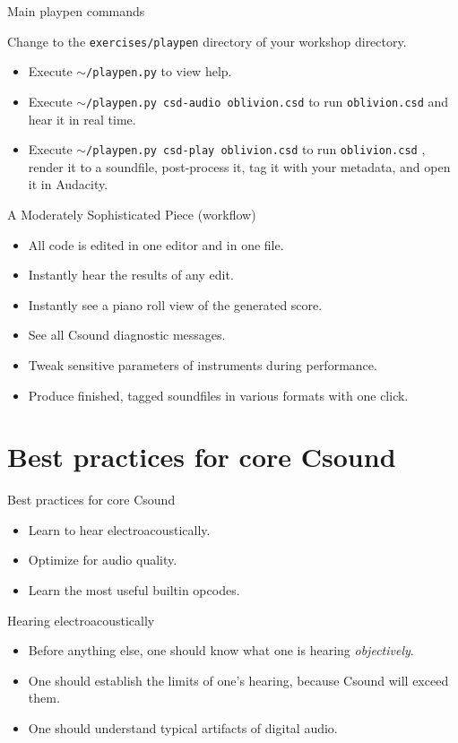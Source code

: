 \documentclass{beamer}
\begin{document}
\begin{frame}{Main playpen commands}
\begin{example}
Change to the \texttt{exercises/playpen} directory of your workshop directory.
\begin{itemize}
\item Execute \texttt{$\sim$/playpen.py} to view help.
\item Execute \texttt{$\sim$/playpen.py csd-audio oblivion.csd} to run \texttt{oblivion.csd} and hear it in real time.
\item Execute \texttt{$\sim$/playpen.py csd-play oblivion.csd} to run \texttt{oblivion.csd} , render it to a soundfile, post-process it, tag it with your metadata, and open it in Audacity.
\end{itemize}
\end{example}
\end{frame}

\begin{frame}{A Moderately Sophisticated Piece (workflow)}
\begin{itemize}
\item All code is edited in one editor and in one file.
\item Instantly hear the results of any edit.
\item Instantly see a piano roll view of the generated score.
\item See all Csound diagnostic messages.
\item Tweak sensitive parameters of instruments during performance.
\item Produce finished, tagged soundfiles in various formats with one click.
\end{itemize}
\end{frame}

\section{Best practices for core Csound}
\begin{frame}{Best practices for core Csound}
\begin{itemize}
\item Learn to hear electroacoustically.
\item Optimize for audio quality.
\item Learn the most useful builtin opcodes.
\end{itemize}
\end{frame}

\begin{frame}{Hearing electroacoustically}
\begin{itemize}
\item Before anything else, one should know what one is hearing \textit{objectively}.
\item One should establish the limits of one's hearing, because Csound will exceed them.
\item One should understand typical artifacts of digital audio.
\end{itemize}
\end{frame}
\end{document}
